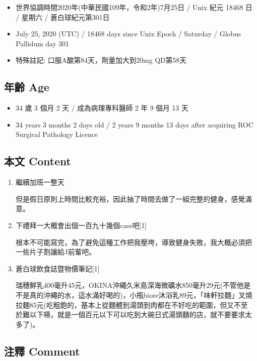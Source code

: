 \documentclass[a5paper, 11pt
]{book}
\providecommand{\tightlist}{%
  \setlength{\itemsep}{0pt}\setlength{\parskip}{0pt}}
\begin{document}
\begin{itemize}
\tightlist
\item
  世界協調時間2020年(中華民國109年，令和2年)7月25日 / Unix 紀元 18468 日
  / 星期六 / 蒼白球紀元第301日
\item
  July 25, 2020 (UTC) / 18468 days since Unix Epoch / Saturday / Globus
  Pallidum day 301
\item
  特殊註記: 口服A酸第84天，劑量加大到20mg QD第58天
\end{itemize}

\hypertarget{ux5e74ux9f61-age-54}{%
\subsection{年齡 Age}\label{ux5e74ux9f61-age-54}}

\begin{itemize}
\tightlist
\item
  34 歲 3 個月 2 天 / 成為病理專科醫師 2 年 9 個月 13 天
\item
  34 years 3 months 2 days old / 2 years 9 months 13 days after
  acquiring ROC Surgical Pathology Licence
\end{itemize}

\hypertarget{ux672cux6587-content-54}{%
\subsection{本文 Content}\label{ux672cux6587-content-54}}

\begin{enumerate}
\def\labelenumi{\arabic{enumi}.}
\item
  繼續加班一整天

  但是假日原則上時間比較充裕，因此抽了時間去做了一組完整的健身，感覺滿意。
\item
  下禮拜一大概會出個一百九十幾個case吧{[}1{]}

  根本不可能寫完，為了避免這種工作把我壓垮，導致健身失敗，我大概必須把一些片子割讓給J前輩吧。
\item
  蒼白球飲食誌暨物價筆記{[}1{]}

  瑞穗鮮乳400毫升45元，OKINA沖繩久米島深海微礦水850毫升29元(不管他是不是真的沖繩的水，這水滿好喝的)，小瓶biore沐浴乳89元，「味軒拉麵」叉燒拉麵85元(吃粗飽的，基本上從麵體到湯頭到肉都在不好吃的範圍，但又不至於難以下嚥，就是一個百元以下可以吃到大碗日式湯頭麵的店，就不要要求太多了)。
\end{enumerate}

\hypertarget{ux6ce8ux91cb-comment-54}{%
\subsection{注釋 Comment}\label{ux6ce8ux91cb-comment-54}}
\end{document}
